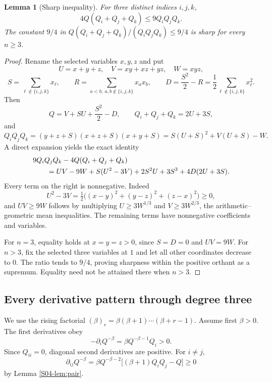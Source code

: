 \documentclass[11pt,a4paper]{article}
\newtheorem{lemma}[theorem]{Lemma}
\theoremstyle{definition}\newtheorem{definition}[theorem]{Definition}
\theoremstyle{remark}\newtheorem{remark}[theorem]{Remark}
\numberwithin{equation}{section}
\begin{document}
\begin{lemma}[Sharp inequality]\label{S04-lem:triple}
For three distinct indices $i,j,k$,
\begin{equation}\label{S04-eq:ineq}
 4Q(Q_i+Q_j+Q_k)\le9Q_iQ_jQ_k.
\end{equation}
The constant $9/4$ in $Q(Q_i+Q_j+Q_k)/(Q_iQ_jQ_k)\le9/4$ is sharp for every $n\ge3$.
\end{lemma}
\begin{proof}
Rename the selected variables $x,y,z$ and put
\[
 U=x+y+z,\quad V=xy+xz+yz,\quad W=xyz,
\]
\[
 S=\sum_{\ell\notin\{i,j,k\}}x_\ell,\qquad
 R=\sum_{a<b,\ a,b\notin\{i,j,k\}}x_ax_b,
 \qquad D=\frac{S^2}{2}-R=\frac12\sum_{\ell\notin\{i,j,k\}}x_\ell^2.
\]
Then
\[
 Q=V+SU+\frac{S^2}{2}-D,
 \qquad Q_i+Q_j+Q_k=2U+3S,
\]
and
\[
 Q_iQ_jQ_k=(y+z+S)(x+z+S)(x+y+S)
 =S(U+S)^2+V(U+S)-W.
\]
A direct expansion yields the exact identity
\begin{align}\label{S04-eq:certificate}
 &9Q_iQ_jQ_k-4Q(Q_i+Q_j+Q_k)\notag\\
 &\qquad=UV-9W+S(U^2-3V)+2S^2U+3S^3+4D(2U+3S).
\end{align}
Every term on the right is nonnegative. Indeed
\[
 U^2-3V=\tfrac12\big((x-y)^2+(y-z)^2+(z-x)^2\big)\ge0,
\]
and $UV\ge9W$ follows by multiplying $U\ge3W^{1/3}$ and $V\ge3W^{2/3}$, the arithmetic--geometric mean inequalities. The remaining terms have nonnegative coefficients and variables.

For $n=3$, equality holds at $x=y=z>0$, since $S=D=0$ and $UV=9W$. For $n>3$, fix the selected three variables at $1$ and let all other coordinates decrease to $0$. The ratio tends to $9/4$, proving sharpness within the positive orthant as a supremum. Equality need not be attained there when $n>3$.
\end{proof}

\subsection{Every derivative pattern through degree three}\label{S04-sec-3}
We use the rising factorial $(\beta)_r=\beta(\beta+1)\cdots(\beta+r-1)$. Assume first $\beta>0$. The first derivatives obey
\[
 -\partial_iQ^{-\beta}=\beta Q^{-\beta-1}Q_i>0.
\]
Since $Q_{ii}=0$, diagonal second derivatives are positive. For $i\ne j$,
\begin{equation}\label{S04-eq:second}
 \partial_{ij}Q^{-\beta}
 =\beta Q^{-\beta-2}\big[(\beta+1)Q_iQ_j-Q\big]\ge0
\end{equation}
by Lemma \ref{S04-lem:pair}.
\end{document}
